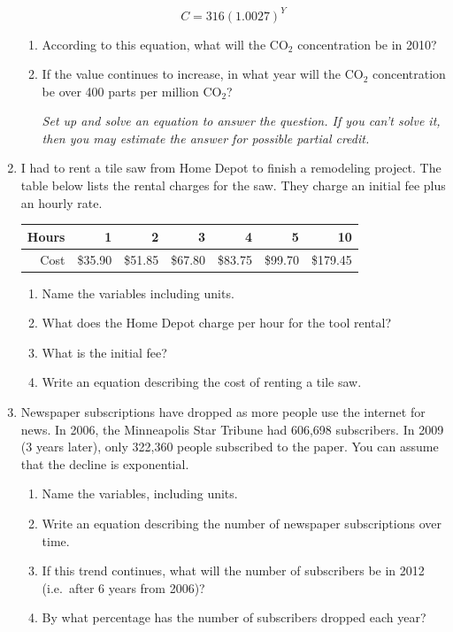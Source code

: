 \documentclass[12pt]{article}
\begin{document}
\begin{enumerate}
$$C=316(1.0027)^Y$$

\begin{enumerate}
\item According to this equation, what will the CO$_{2}$ concentration be in 2010?
\vfill
\item If the value continues to increase, in what year will the CO$_{2}$ concentration be over 400 parts per million CO$_{2}$?

\emph{Set up and solve an equation to answer the question.  If you can't solve it, then you may estimate the answer for possible partial credit.}
\vfill
\vfill
\vfill
\end{enumerate}


\newpage %

\item I had to rent a tile saw from Home Depot to finish a remodeling project.    The table below lists the rental charges for the saw.  They charge an initial fee plus an hourly rate.

\begin{center}
\begin{tabular} {|r|r|r|r|r|r|r|} \hline
Hours & 1 & 2 & 3 & 4 & 5 & 10 \\ \hline
Cost & \$35.90 & \$51.85 & \$67.80 & \$83.75 & \$99.70 & \$179.45 \\ \hline
\end{tabular}
\end{center}

\begin{enumerate}
\item Name the variables including units.
\vfill
\item What does the Home Depot charge per hour for the tool rental?
\vfill
\item What is the initial fee?
\vfill
\item Write an equation describing the cost of renting a tile saw.
\vfill
\end{enumerate}

\newpage %
\item Newspaper subscriptions have dropped as more people use the internet for news.  In 2006, the Minneapolis Star Tribune had 606,698 subscribers.  In 2009 (3 years later), only 322,360 people subscribed to the paper. You can assume that the decline is exponential.

\begin{enumerate}
\item Name the variables, including units.
\vfill
\item Write an equation describing the number of newspaper subscriptions over time.
\vfill
\item If this trend continues, what will the number of subscribers be in 2012 (i.e.\ after 6 years from 2006)?
\vfill
\item By what percentage has the number of subscribers dropped each year?
\vfill

\end{enumerate}



\end{enumerate}
\end{document}
